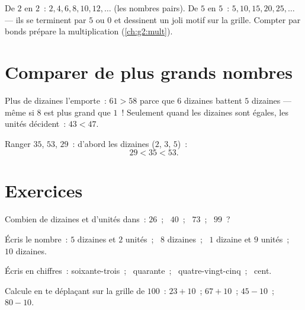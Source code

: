 \begin{example}[Compter de 2 en 2 et de 5 en 5]\label{ex:g1:tens:skip}
De $2$ en $2$~: $2, 4, 6, 8, 10, 12, \dots$ (les nombres pairs). De
$5$ en $5$~: $5, 10, 15, 20, 25, \dots$ --- ils se terminent par $5$
ou $0$ et dessinent un joli motif sur la grille. Compter par bonds
prépare la multiplication (\cref{ch:g2:mult}).
\end{example}

\section{Comparer de plus grands nombres}

\begin{method}\label{met:g1:tens:compare}
Plus de dizaines l'emporte~: $61 > 58$ parce que $6$ dizaines battent
$5$ dizaines --- même si $8$ est plus grand que $1$~! Seulement
quand les dizaines sont égales, les unités décident~:
$43 < 47$.
\end{method}

\begin{example}\label{ex:g1:tens:compare}
Ranger $35$, $53$, $29$~: d'abord les dizaines ($2$, $3$, $5$)~:
\[
29 < 35 < 53 .
\]
\end{example}

\section{Exercices}

\begin{exercise}[$\star$]\label{exo:g1:tens:1}
Combien de dizaines et d'unités dans~: $26$~; \ $40$~; \ $73$~;
\ $99$~?
\end{exercise}

\begin{exercise}[$\star$]\label{exo:g1:tens:2}
Écris le nombre~: $5$ dizaines et $2$ unités~; \ $8$ dizaines~;
\ $1$ dizaine et $9$ unités~; \ $10$ dizaines.
\end{exercise}

\begin{exercise}[$\star$]\label{exo:g1:tens:3}
Écris en chiffres~: soixante-trois~; \ quarante~; \
quatre-vingt-cinq~; \ cent.
\end{exercise}

\begin{exercise}[$\star$]\label{exo:g1:tens:4}
Calcule en te déplaçant sur la grille de $100$~: $23 + 10$~;
\quad $67 + 10$~; \quad $45 - 10$~; \quad $80 - 10$.
\end{exercise}

